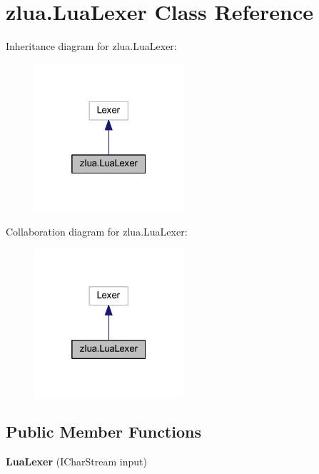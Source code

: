 \hypertarget{classzlua_1_1_lua_lexer}{}\section{zlua.\+Lua\+Lexer Class Reference}
\label{classzlua_1_1_lua_lexer}


Inheritance diagram for zlua.\+Lua\+Lexer\+:
\nopagebreak
\begin{figure}[H]
\begin{center}
\leavevmode
\includegraphics[width=157pt]{classzlua_1_1_lua_lexer__inherit__graph}
\end{center}
\end{figure}


Collaboration diagram for zlua.\+Lua\+Lexer\+:
\nopagebreak
\begin{figure}[H]
\begin{center}
\leavevmode
\includegraphics[width=157pt]{classzlua_1_1_lua_lexer__coll__graph}
\end{center}
\end{figure}
\subsection*{Public Member Functions}
\begin{DoxyCompactItemize}
\item 
\mbox{\label{classzlua_1_1_lua_lexer_aae5ec131bc44e99c0054f4e8085e5875}} 
{\bfseries Lua\+Lexer} (I\+Char\+Stream input)
\end{DoxyCompactItemize}

